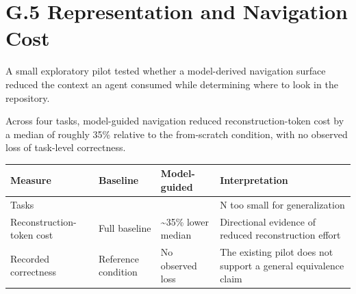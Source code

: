 
\section{G.5 Representation and Navigation Cost}\label{heading:nav-pilot}

A small exploratory pilot tested whether a model-derived navigation surface reduced the context an agent consumed while determining where to look in the repository.

Across four tasks, model-guided navigation reduced reconstruction-token cost by a median of roughly 35\% relative to the from-scratch condition, with no observed loss of task-level correctness.

{\footnotesize
{\def\LTcaptype{none} %
\begin{longtable}[]{@{}
  >{\raggedright\arraybackslash}p{}
  >{\raggedright\arraybackslash}p{}
  >{\raggedright\arraybackslash}p{}
  >{\raggedright\arraybackslash}p{}@{}}
\toprule\noalign{}
\begin{minipage}[b]{\linewidth}\raggedright
Measure
\end{minipage} & \begin{minipage}[b]{\linewidth}\raggedright
Baseline
\end{minipage} & \begin{minipage}[b]{\linewidth}\raggedright
Model-guided
\end{minipage} & \begin{minipage}[b]{\linewidth}\raggedright
Interpretation
\end{minipage} \\
\midrule\noalign{}
\endhead
\bottomrule\noalign{}
\endlastfoot

Tasks & 4 & 4 & N too small for generalization \\
Reconstruction-token cost & Full baseline & \textasciitilde35\% lower median & Directional evidence of reduced reconstruction effort \\
Recorded correctness & Reference condition & No observed loss & The existing pilot does not support a general equivalence claim \\
\end{longtable}
}
}

